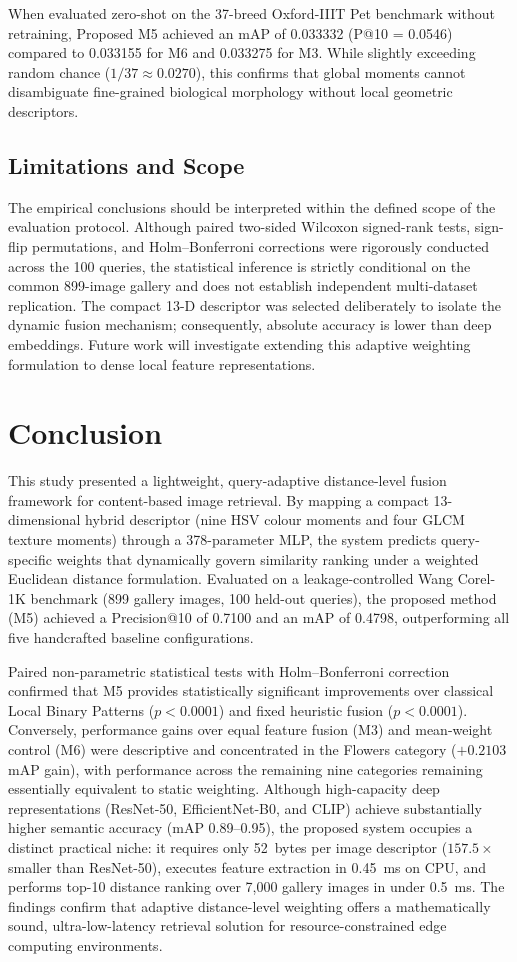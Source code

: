 \documentclass[pdflatex,sn-mathphys-num]{sn-jnl}
\begin{document}
When evaluated zero-shot on the 37-breed Oxford-IIIT Pet benchmark without retraining, Proposed M5 achieved an mAP of 0.033332 (P@10 = 0.0546) compared to 0.033155 for M6 and 0.033275 for M3. While slightly exceeding random chance ($1/37 \approx 0.0270$), this confirms that global moments cannot disambiguate fine-grained biological morphology without local geometric descriptors.

\subsection{Limitations and Scope}
The empirical conclusions should be interpreted within the defined scope of the evaluation protocol. Although paired two-sided Wilcoxon signed-rank tests, sign-flip permutations, and Holm--Bonferroni corrections were rigorously conducted across the 100 queries, the statistical inference is strictly conditional on the common 899-image gallery and does not establish independent multi-dataset replication. The compact 13-D descriptor was selected deliberately to isolate the dynamic fusion mechanism; consequently, absolute accuracy is lower than deep embeddings. Future work will investigate extending this adaptive weighting formulation to dense local feature representations.

\section{Conclusion}\label{sec6}
This study presented a lightweight, query-adaptive distance-level fusion framework for content-based image retrieval. By mapping a compact 13-dimensional hybrid descriptor (nine HSV colour moments and four GLCM texture moments) through a 378-parameter MLP, the system predicts query-specific weights that dynamically govern similarity ranking under a weighted Euclidean distance formulation. Evaluated on a leakage-controlled Wang Corel-1K benchmark (899 gallery images, 100 held-out queries), the proposed method (M5) achieved a Precision@10 of 0.7100 and an mAP of 0.4798, outperforming all five handcrafted baseline configurations.

Paired non-parametric statistical tests with Holm--Bonferroni correction confirmed that M5 provides statistically significant improvements over classical Local Binary Patterns ($p < 0.0001$) and fixed heuristic fusion ($p < 0.0001$). Conversely, performance gains over equal feature fusion (M3) and mean-weight control (M6) were descriptive and concentrated in the Flowers category ($+0.2103$ mAP gain), with performance across the remaining nine categories remaining essentially equivalent to static weighting. Although high-capacity deep representations (ResNet-50, EfficientNet-B0, and CLIP) achieve substantially higher semantic accuracy (mAP 0.89--0.95), the proposed system occupies a distinct practical niche: it requires only 52~bytes per image descriptor ($157.5\times$ smaller than ResNet-50), executes feature extraction in 0.45~ms on CPU, and performs top-10 distance ranking over 7,000 gallery images in under 0.5~ms. The findings confirm that adaptive distance-level weighting offers a mathematically sound, ultra-low-latency retrieval solution for resource-constrained edge computing environments.
\end{document}
